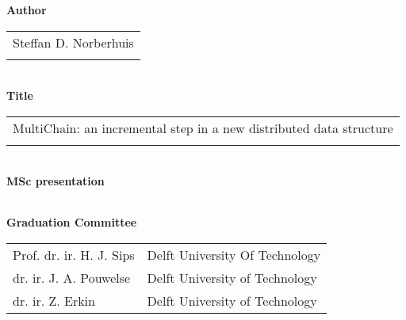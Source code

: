 \thispagestyle{empty}

\noindent \textbf{Author}\\
\begin{tabular}{l}
Steffan D. Norberhuis\\
\\
\end{tabular}\\
\noindent \textbf{Title}\\
\begin{tabular}{l}
MultiChain: an incremental step in a new distributed data structure\\
\\
\end{tabular}\\
\noindent \textbf{MSc presentation}\\
\begin{tabular}{l}
\\
\end{tabular}

\vspace{1.1cm}

\noindent \textbf{Graduation Committee}\\
\begin{tabular}{ll}
Prof. dr. ir. H. J. Sips            & Delft University Of Technology \\
dr. ir. J. A. Pouwelse        & Delft University of Technology \\
dr. ir. Z. Erkin              & Delft University of Technology \\
\end{tabular}


